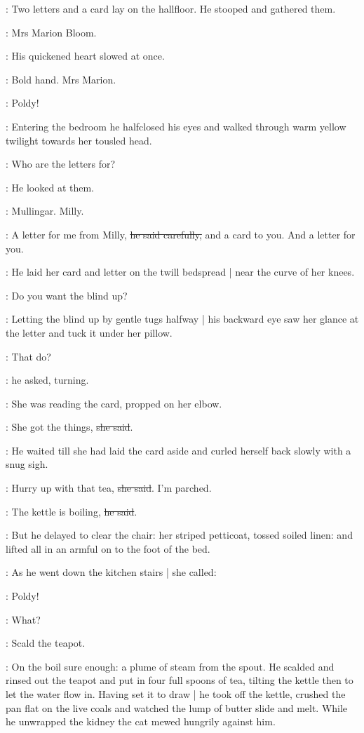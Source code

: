 :
Two letters and a card lay on the hallfloor.
He stooped and gathered them.

\BloomInt:
Mrs Marion Bloom.

:
His quickened heart slowed at once.

\BloomInt:
Bold hand.
Mrs Marion.

\Molly:
Poldy!

:
Entering the bedroom
he halfclosed his eyes
and walked through warm yellow twilight
towards her tousled head.

\Molly:
Who are the letters for?

:
He looked at them.

\BloomInt:
Mullingar.
Milly.

\Bloom:
A letter for me from Milly,
\sout{he said carefully,}
and a card to you.
And a letter for you.

:
He laid her card and letter
on the twill bedspread |
near the curve of her knees.

\Bloom:
Do you want the blind up?

:
Letting the blind up by gentle tugs halfway |
his backward eye saw her glance at the letter
and tuck it under her pillow.

\Bloom:
That do?

:
he asked,
turning.

:
She was reading the card,
propped on her elbow.

\Molly:
She got the things,
\sout{she said}.

:
He waited till she had laid the card aside
and curled herself back slowly with a snug sigh.

\Molly:
Hurry up with that tea,
\sout{she said}.
I'm parched.

\Bloom:
The kettle is boiling,
\sout{he said}.

:
But he delayed to clear the chair:
her striped petticoat, tossed soiled linen:
and lifted all in an armful on to the foot of the bed.

:
As he went down the kitchen stairs |
she called:

\Molly:
Poldy!

\Bloom:
What?

\Molly:
Scald the teapot.

:
On the boil sure enough:
a plume of steam from the spout.
He scalded and rinsed out the teapot and put in four full spoons of tea,
tilting the kettle then to let the water flow in.
Having set it to draw |
he took off the kettle,
crushed the pan flat on the live coals
and watched the lump of butter slide and melt.
While he unwrapped the kidney
the cat mewed hungrily against him.

